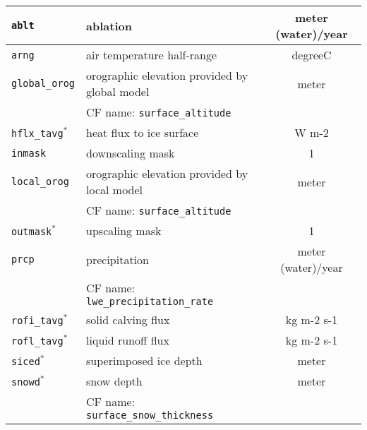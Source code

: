 
\begin{center}
  \tablelasttail{\hline}
  \begin{supertabular}{|l|p{8cm}|c|}
    \hline
\texttt{ablt} & ablation & meter (water)/year\\
\hline
\texttt{arng} & air temperature half-range & degreeC\\
\hline
\texttt{global\_orog} & orographic elevation provided by global model & meter\\
&CF name: \texttt{surface\_altitude}&\\
\hline
\texttt{hflx\_tavg}$^\ast$ & heat flux to ice surface & W m-2\\
\hline
\texttt{inmask} & downscaling mask & 1\\
\hline
\texttt{local\_orog} & orographic elevation provided by local model & meter\\
&CF name: \texttt{surface\_altitude}&\\
\hline
\texttt{outmask}$^\ast$ & upscaling mask & 1\\
\hline
\texttt{prcp} & precipitation & meter (water)/year\\
&CF name: \texttt{lwe\_precipitation\_rate}&\\
\hline
\texttt{rofi\_tavg}$^\ast$ & solid calving flux & kg m-2 s-1\\
\hline
\texttt{rofl\_tavg}$^\ast$ & liquid runoff flux & kg m-2 s-1\\
\hline
\texttt{siced}$^\ast$ & superimposed ice depth & meter\\
\hline
\texttt{snowd}$^\ast$ & snow depth & meter\\
&CF name: \texttt{surface\_snow\_thickness}&\\
\hline
  \end{supertabular}
\end{center}
